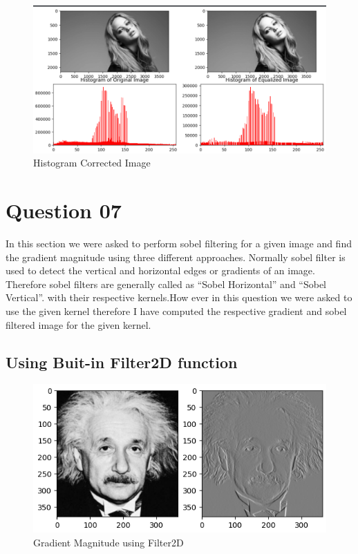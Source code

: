 \documentclass[11pt,a4paper]{article}
\begin{document}
\newpage

{\begin{figure}[h]
    \centering
    \includegraphics[width=1\linewidth]{images/6-6.png}
    \caption{Histogram Corrected Image}
\end{figure}}



\section{Question 07}

In this section we were asked to perform sobel filtering for a given image and find the gradient magnitude using three different approaches. Normally sobel filter is used to detect the vertical and horizontal edges or gradients of an image. Therefore sobel filters are generally called as ``Sobel Horizontal'' and ``Sobel Vertical''. with their respective kernels.How ever in this question we were asked to use the given kernel therefore I have computed the respective gradient and sobel filtered image for the given kernel.


\subsection{Using Buit-in Filter2D function}
\lstset{style=mystyle}


{\begin{figure}[h]
    \centering
    \includegraphics[width=1\linewidth]{images/7-1.png}
    \caption{Gradient Magnitude using Filter2D}
\end{figure}}
\newpage
\end{document}
